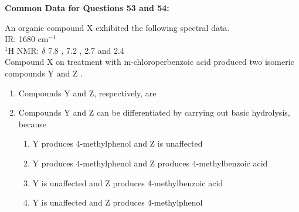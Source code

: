 \documentclass[journal,12pt,onecolumn]{IEEEtran}
\theoremstyle{remark}
\begin{document}
\textbf{Common Data for Questions 53 and 54:}

An organic compound X  exhibited the following spectral data.
 \\
IR: 1680 cm$^{-1}$ \\
$^1$H NMR: $\delta$ 7.8 , 7.2 , 2.7  and 2.4  \\
Compound X on treatment with m-chloroperbenzoic acid produced two isomeric compounds Y  and Z .
 \begin{enumerate}[resume]
\item Compounds Y and Z, respectively, are
\begin{enumerate}
\end{enumerate}
\hfill{}
    


\item Compounds Y and Z can be differentiated by carrying out basic hydrolysis, because
    \begin{enumerate}
        \item Y produces 4-methylphenol and Z is unaffected
        \item Y produces 4-methylphenol and Z produces 4-methylbenzoic acid
        \item Y is unaffected and Z produces 4-methylbenzoic acid
 
        \item Y is unaffected and Z produces 4-methylphenol
        \hfill{}
    \end{enumerate}
\end{enumerate}
\end{document}
